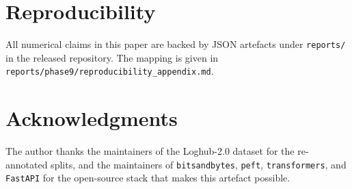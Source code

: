 \documentclass[journal, twoside]{IEEEtran}
\begin{document}
\section*{Reproducibility}

All numerical claims in this paper are backed by JSON artefacts under
\texttt{reports/} in the released repository. The mapping is given in
\texttt{reports/phase9/reproducibility\_appendix.md}.

\section*{Acknowledgments}

The author thanks the maintainers of the
Loghub-2.0 \cite{loghub2024} dataset for the re-annotated splits, and
the maintainers of \texttt{bitsandbytes}, \texttt{peft},
\texttt{transformers}, and \texttt{FastAPI} for the open-source stack
that makes this artefact possible.



\end{document}
